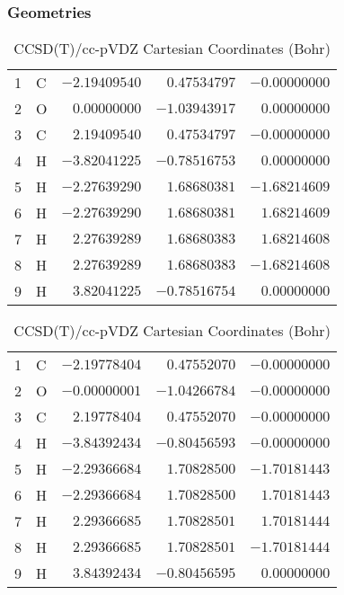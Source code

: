 \documentclass[10pt,oneside]{article}
\begin{document}
\clearpage

\subsection{}

\begin{table}[h!]
\subsubsection*{Geometries}
\begin{multicols}{2}
\centering
\caption{CCSD(T)/cc-pVTZ Cartesian Coordinates (Bohr)}
\begin{tabular}{llrrr}
\toprule
1  & C  & $-2.19409540$ & $ 0.47534797$ & $-0.00000000$ \\
2  & O  & $ 0.00000000$ & $-1.03943917$ & $ 0.00000000$ \\
3  & C  & $ 2.19409540$ & $ 0.47534797$ & $-0.00000000$ \\
4  & H  & $-3.82041225$ & $-0.78516753$ & $ 0.00000000$ \\
5  & H  & $-2.27639290$ & $ 1.68680381$ & $-1.68214609$ \\
6  & H  & $-2.27639290$ & $ 1.68680381$ & $ 1.68214609$ \\
7  & H  & $ 2.27639289$ & $ 1.68680383$ & $ 1.68214608$ \\
8  & H  & $ 2.27639289$ & $ 1.68680383$ & $-1.68214608$ \\
9  & H  & $ 3.82041225$ & $-0.78516754$ & $ 0.00000000$ \\
\bottomrule
\end{tabular}
\caption{CCSD(T)/cc-pVDZ Cartesian Coordinates (Bohr)}
\begin{tabular}{llrrr}
\toprule
1  & C  & $-2.19778404$ & $ 0.47552070$ & $-0.00000000$ \\
2  & O  & $-0.00000001$ & $-1.04266784$ & $-0.00000000$ \\
3  & C  & $ 2.19778404$ & $ 0.47552070$ & $-0.00000000$ \\
4  & H  & $-3.84392434$ & $-0.80456593$ & $-0.00000000$ \\
5  & H  & $-2.29366684$ & $ 1.70828500$ & $-1.70181443$ \\
6  & H  & $-2.29366684$ & $ 1.70828500$ & $ 1.70181443$ \\
7  & H  & $ 2.29366685$ & $ 1.70828501$ & $ 1.70181444$ \\
8  & H  & $ 2.29366685$ & $ 1.70828501$ & $-1.70181444$ \\
9  & H  & $ 3.84392434$ & $-0.80456595$ & $ 0.00000000$ \\
\bottomrule
\end{tabular}
\end{multicols}
\end{table}
\end{document}

